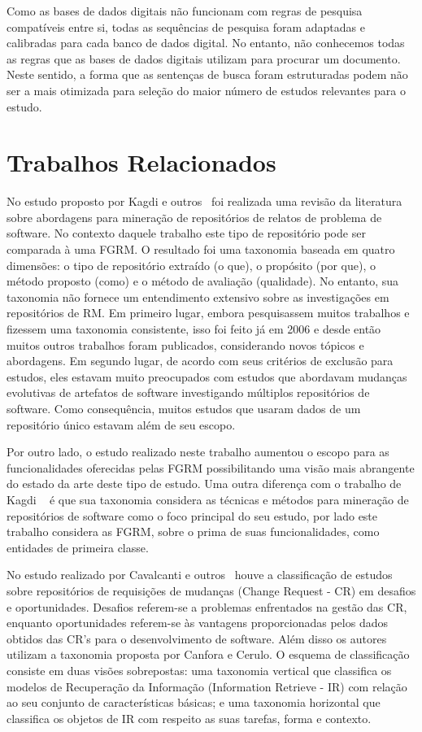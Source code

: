 Como as bases de dados digitais não funcionam com regras de pesquisa compatíveis
entre si, todas as sequências de pesquisa foram adaptadas e calibradas para cada
banco de dados digital. No entanto, não conhecemos todas as regras que as bases
de dados digitais utilizam para procurar um documento. Neste sentido, a forma
que as sentenças de busca foram estruturadas podem não ser a mais otimizada para
seleção do maior número de estudos relevantes para o estudo.

\section{Trabalhos Relacionados}
\label{sec:trabalhos_relacionados}

No estudo proposto por Kagdi e outros~\cite{kagdi2012assigning} foi realizada
uma revisão da literatura sobre abordagens para mineração de repositórios de
relatos de problema de software. No contexto daquele trabalho este tipo de
repositório pode ser comparada à uma FGRM\@. O resultado foi uma taxonomia
baseada em quatro dimensões: o tipo de repositório extraído (o que), o propósito
(por que), o método proposto (como) e o método de avaliação (qualidade). No
entanto, sua taxonomia não fornece um entendimento extensivo sobre as
investigações em repositórios de RM. Em primeiro lugar, embora pesquisassem
muitos trabalhos e fizessem uma taxonomia consistente, isso foi feito já em 2006 e
desde então muitos outros trabalhos foram publicados, considerando novos tópicos
e abordagens. Em segundo lugar, de acordo com seus critérios de exclusão para
estudos, eles estavam muito preocupados com estudos que abordavam mudanças
evolutivas de artefatos de software investigando múltiplos repositórios de
software. Como consequência, muitos estudos que usaram dados de um repositório
único estavam além de seu escopo.

Por outro lado, o estudo realizado neste trabalho aumentou o escopo para as
funcionalidades oferecidas pelas FGRM possibilitando uma visão mais abrangente
do estado da arte deste tipo de estudo. Uma outra diferença com o trabalho de
Kagdi ~\cite{kagdi2012assigning} é que sua taxonomia considera as técnicas e
métodos para mineração de repositórios de software como o foco principal do seu
estudo, por lado este trabalho considera as FGRM, sobre o prima de suas
funcionalidades, como entidades de primeira classe.

No estudo realizado por Cavalcanti e outros~\cite{cavalcanti2014challenges}
houve a classificação de estudos sobre repositórios de requisições de mudanças
(Change Request - CR) em desafios e oportunidades.  Desafios referem-se a
problemas enfrentados na gestão das CR, enquanto oportunidades referem-se às
vantagens proporcionadas pelos dados obtidos das  CR's para o desenvolvimento de
software. Além disso os autores utilizam a taxonomia proposta por Canfora e
Cerulo\cite{cerulo2004taxonomy}. O esquema de classificação consiste em duas
visões sobrepostas: uma taxonomia vertical que classifica os modelos de
Recuperação da Informação (Information Retrieve - IR) com relação ao seu
conjunto de características básicas; e uma taxonomia horizontal que classifica
os objetos de IR com respeito as suas tarefas, forma e contexto.

